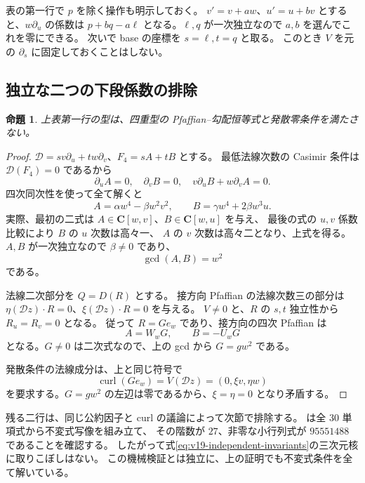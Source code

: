 \documentclass[11pt,a4paper]{ltjsarticle}
\newcommand{\CC}{\mathbf C}\newcommand{\QQ}{\mathbf Q}
\newtheorem{proposition}[theorem]{命題}
\theoremstyle{remark}\newtheorem{remark}[theorem]{注意}
\begin{document}
表の第一行で $p$ を除く操作も明示しておく。
$v'=v+aw$、$u'=u+bv$ とすると、$w\partial_u$ の係数は
$p+bq-a\ell$ となる。$\ell,q$ が一次独立なので $a,b$ を選んでこれを零にできる。
次いで base の座標を $s=\ell,t=q$ と取る。
このとき $V$ を元の $\partial_s$ に固定しておくことはしない。

\subsection{独立な二つの下段係数の排除}

\begin{proposition}\label{prop:v19-independent-pencil}
上表第一行の型は、四重型の Pfaffian--勾配恒等式と発散零条件を満たさない。
\end{proposition}

\begin{proof}
$\mathcal D=sv\partial_u+tw\partial_v$、$F_4=sA+tB$ とする。
最低法線次数の Casimir 条件は $\mathcal D(F_4)=0$ であるから
\[
       \partial_u A=0,\quad \partial_v B=0,
       \quad v\partial_uB+w\partial_vA=0.
\]
四次同次性を使って全て解くと
\begin{equation}\label{eq:v19-independent-invariants}
 A=\alpha w^4-\beta w^2v^2,
 \qquad B=\gamma w^4+2\beta w^3u.
\end{equation}
実際、最初の二式は $A\in\CC[w,v]$、$B\in\CC[w,u]$ を与え、
最後の式の $u,v$ 係数比較により $B$ の $u$ 次数は高々一、
$A$ の $v$ 次数は高々二となり、上式を得る。
$A,B$ が一次独立なので $\beta\ne0$ であり、
\[
                           \gcd(A,B)=w^2
\]
である。

法線二次部分を $Q=D(R)$ とする。
接方向 Pfaffian の法線次数三の部分は
$\eta(\mathcal Dz)\cdot R=0$、$\xi(\mathcal Dz)\cdot R=0$ を与える。
$V\ne0$ と、$R$ の $s,t$ 独立性から $R_u=R_v=0$ となる。
従って $R=G e_w$ であり、接方向の四次 Pfaffian は
\[
                           A=W_wG,\qquad B=-U_wG
\]
となる。$G\ne0$ は二次式なので、上の gcd から $G=gw^2$ である。

発散条件の法線成分は、上と同じ符号で
\[
 \operatorname{curl}(Ge_w)=V(\mathcal Dz)=(0,\xi v,\eta w)
\]
を要求する。$G=gw^2$ の左辺は零であるから、$\xi=\eta=0$ となり矛盾する。
\end{proof}

残る二行は、同じ公約因子と curl の議論によって次節で排除する。
 は全 $30$ 単項式から不変式写像を組み立て、
その階数が $27$、非零な小行列式が $95551488$ であることを確認する。
したがって式\eqref{eq:v19-independent-invariants}の三次元核に取りこぼしはない。
この機械検証とは独立に、上の証明でも不変式条件を全て解いている。
\end{document}
